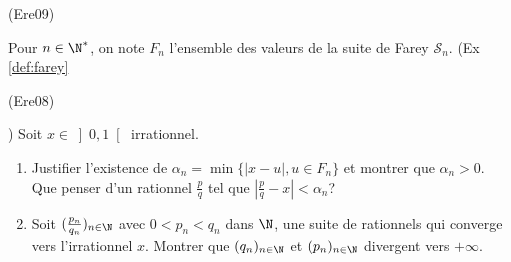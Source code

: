 \begin{tiny}(Ere09)\end{tiny} Pour $n \in \N^*$, on note $F_{n}$ l'ensemble des valeurs de la suite de Farey $\mathcal{S}_n$. (Ex \ref{def:farey} \begin{tiny}(Ere08)                                                                                                                                          \end{tiny})\newline
Soit $x \in \left] 0,1\right[ $ irrationnel.
\begin{enumerate}
  \item Justifier l'existence de $\alpha _{n}=\min \{\left| x-u\right| ,u\in F_{n}\}$ et montrer que
$\alpha_{n}>0$. Que penser d'un rationnel $\frac{p}{q}$ tel que $\left| \frac{p}{q}-x\right| <\alpha _{n}$?
  \item Soit $(\frac{p_{n}}{q_{n}})_{n\in \N}$ avec $0<p_{n}<q_{n}$ dans $\N$, une suite de rationnels qui converge vers l'irrationnel
$x$. Montrer que $(q_{n})_{n\in \N}$ et $(p_{n})_{n\in \N}$ divergent vers $+\infty $.
\end{enumerate}
